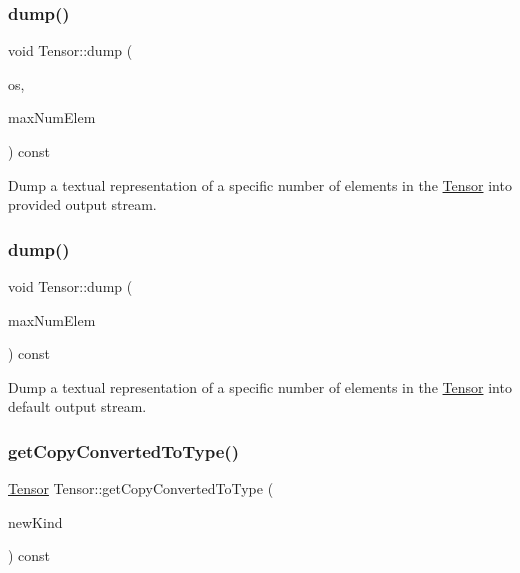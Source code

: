 \subsubsection{\texorpdfstring{dump()}{dump()}\hspace{0.1cm}{\footnotesize\ttfamily [1/2]}}
{\footnotesize\ttfamily void Tensor\+::dump (\begin{DoxyParamCaption}\item[{llvm\+::raw\+\_\+ostream \&}]{os,  }\item[{unsigned}]{max\+Num\+Elem }\end{DoxyParamCaption}) const}

Dump a textual representation of a specific number of elements in the \hyperlink{classglow_1_1_tensor}{Tensor} into provided output stream. \mbox{\label{classglow_1_1_tensor_afb64938f01ec86bb60020eebb1edf4e1}} 
\subsubsection{\texorpdfstring{dump()}{dump()}\hspace{0.1cm}{\footnotesize\ttfamily [2/2]}}
{\footnotesize\ttfamily void Tensor\+::dump (\begin{DoxyParamCaption}\item[{unsigned}]{max\+Num\+Elem }\end{DoxyParamCaption}) const}

Dump a textual representation of a specific number of elements in the \hyperlink{classglow_1_1_tensor}{Tensor} into default output stream. \mbox{\label{classglow_1_1_tensor_a5a65f889cbe5429225fe9d2ffe431a38}} 
\subsubsection{\texorpdfstring{get\+Copy\+Converted\+To\+Type()}{getCopyConvertedToType()}}
{\footnotesize\ttfamily \hyperlink{classglow_1_1_tensor}{Tensor} Tensor\+::get\+Copy\+Converted\+To\+Type (\begin{DoxyParamCaption}\item[{\hyperlink{namespaceglow_ab92e14a94329daf4083db670e95fbcdf}{Elem\+Kind}}]{new\+Kind }\end{DoxyParamCaption}) const}

